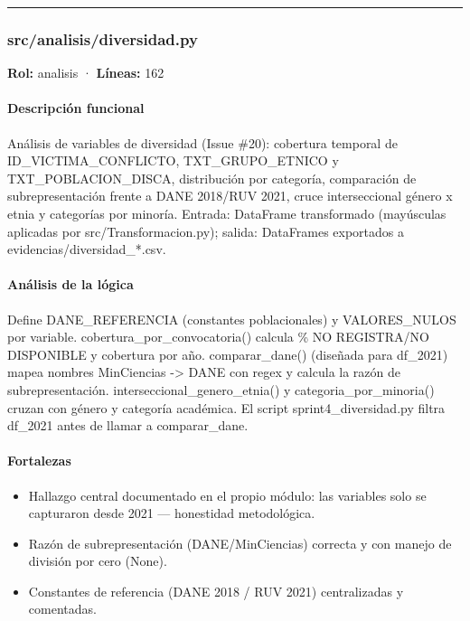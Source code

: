 \medskip
\hrule

\subsubsection{src/analisis/diversidad.py}
\textbf{Rol:} analisis · \textbf{Líneas:} 162

\paragraph{Descripción funcional}
Análisis de variables de diversidad (Issue \#20): cobertura temporal de ID\_VICTIMA\_CONFLICTO, TXT\_GRUPO\_ETNICO y TXT\_POBLACION\_DISCA, distribución por categoría, comparación de subrepresentación frente a DANE 2018/RUV 2021, cruce interseccional género x etnia y categorías por minoría. Entrada: DataFrame transformado (mayúsculas aplicadas por src/Transformacion.py); salida: DataFrames exportados a evidencias/diversidad\_*.csv.

\paragraph{Análisis de la lógica}
Define DANE\_REFERENCIA (constantes poblacionales) y VALORES\_NULOS por variable. cobertura\_por\_convocatoria() calcula \% NO REGISTRA/NO DISPONIBLE y cobertura por año. comparar\_dane() (diseñada para df\_2021) mapea nombres MinCiencias -> DANE con regex y calcula la razón de subrepresentación. interseccional\_genero\_etnia() y categoria\_por\_minoria() cruzan con género y categoría académica. El script sprint4\_diversidad.py filtra df\_2021 antes de llamar a comparar\_dane.

\paragraph{Fortalezas}
\begin{itemize}
  \item Hallazgo central documentado en el propio módulo: las variables solo se capturaron desde 2021 --- honestidad metodológica.
  \item Razón de subrepresentación (DANE/MinCiencias) correcta y con manejo de división por cero (None).
  \item Constantes de referencia (DANE 2018 / RUV 2021) centralizadas y comentadas.
\end{itemize}

